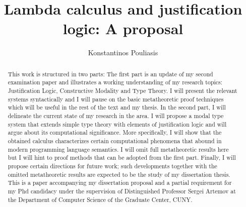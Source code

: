 \documentclass[12pt]{report}
\title{Lambda calculus and justification logic: A proposal}
\author{Konstantinos Pouliasis}
\begin{document}
\maketitle


\begin{abstract}
This work  is structured in two parts: 
The first part is an update of my second examination paper and illustrates a  working understanding of my research topics: Justification Logic, Constructive Modality and Type Theory. I will present the relevant systems syntactically and I will pause on the basic metatheoretic
proof techniques which will be useful in the rest of the text and my thesis.
In the second part, I will delineate the current state of my research in the area.
I will propose  a modal type system that extends simple type theory with elements of justification logic and will argue about its computational significance. More specifically, I will show  
that the obtained calculus characterizes  certain computational phenomena that abound in modern programming language semantics. 
I will omit full metatheoretic
results here but I will hint to  proof methods that can be adopted from the first part. Finally,  I will propose certain
directions for future work; such developments together with the omitted metatheoretic results are expected to be the study of my dissertation thesis.
This is a  paper accompanying my dissertation proposal and a partial requirement for my Phd candidacy under the supervision of Distinguished Professor Sergei Artemov at the Department of Computer Science of the Graduate Center, CUNY.
\end{abstract}
\tableofcontents










\nocite{Pfenning2009a, Pfenning2009b}




\end{document}
